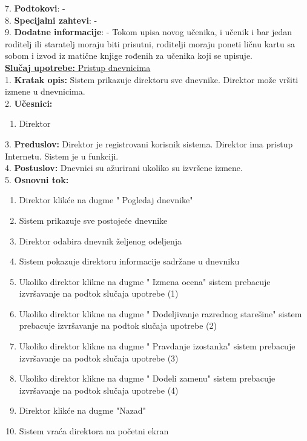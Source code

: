 \documentclass{article}
\begin{document}
7. \textbf{Podtokovi}:  - \\

8. \textbf{Specijalni zahtevi}: - \\

9. \textbf{Dodatne informacije}: - Tokom upisa novog učenika, i učenik i bar jedan roditelj ili staratelj moraju biti prisutni, roditelji moraju poneti ličnu kartu sa sobom i izvod iz matične knjige rođenih za učenika koji se upisuje.\\


\underline{\textbf{Slučaj upotrebe:} Pristup dnevnicima} \\

1. \textbf{Kratak opis:}  Sistem prikazuje direktoru sve dnevnike. Direktor može vršiti izmene u dnevnicima. \\

2. \textbf{Učesnici:}
\begin{enumerate} 
\item Direktor
\end{enumerate} 

3. \textbf{Preduslov:} Direktor je registrovani korisnik sistema. Direktor ima pristup Internetu. Sistem je u funkciji. \\

4. \textbf{Postuslov:}  Dnevnici su ažurirani ukoliko su izvršene izmene.\\

5. \textbf{Osnovni tok:} 
\begin{enumerate} 
\item Direktor klikće na dugme " {Pogledaj dnevnike}" 
\item Sistem prikazuje sve postojeće dnevnike
\item Direktor odabira dnevnik željenog odeljenja
\item Sistem pokazuje direktoru informacije sadržane u dnevniku
\item Ukoliko direktor klikne na dugme " {Izmena} ocena"  {sistem} prebacuje izvršavanje na podtok slučaja upotrebe (1)
\item Ukoliko direktor klikne na dugme " {Dodeljivanje} razrednog starešine" sistem prebacuje izvršavanje na podtok slučaja upotrebe (2)
\item Ukoliko direktor klikne na dugme " {Pravdanje izostanka}" {sistem} prebacuje izvršavanje na podtok slučaja upotrebe (3)
\item Ukoliko direktor klikne na dugme " {Dodeli zamenu}"  {sistem} prebacuje izvršavanje na podtok slučaja upotrebe (4)
\item Direktor klikće na dugme "Nazad" 
\item Sistem vraća direktora na početni ekran

\end{enumerate}
\end{document}
